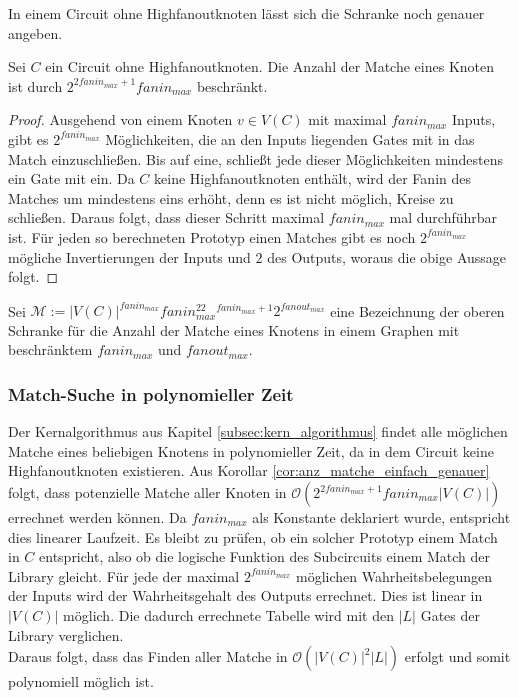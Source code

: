 \documentclass[11pt, a4paper, german]{article}
\begin{document}
In einem Circuit ohne Highfanoutknoten lässt sich die Schranke noch genauer angeben. 
\begin{cor}\label{cor:anz_matche_einfach_genauer}
Sei $C$ ein Circuit ohne Highfanoutknoten. Die Anzahl der Matche eines Knoten ist durch $2^{2fanin_{max} +1}fanin_{max}$ beschränkt.
\end{cor}
\begin{proof}
Ausgehend von einem Knoten $v \in V(C)$ mit maximal $fanin_{max}$ Inputs, gibt es  $2^{fanin_{max}}$ Möglichkeiten, die an den Inputs liegenden Gates mit in das Match einzuschließen. Bis auf eine, schließt jede dieser Möglichkeiten mindestens ein Gate mit ein. Da $C$ keine Highfanoutknoten enthält, wird der Fanin des Matches um mindestens eins erhöht, denn es ist nicht möglich, Kreise zu schließen. Daraus folgt, dass dieser Schritt maximal $fanin_{max}$ mal durchführbar ist. Für jeden so berechneten Prototyp einen Matches gibt es noch $2^{fanin_{max}}$ mögliche Invertierungen der Inputs und $2$ des Outputs, woraus die obige Aussage folgt.
\end{proof}
\begin{definition}
Sei $\mathcal{M}:= |V(C)|^{fanin_{max}} fanin_{max}^22^{fanin_{max}+1}2^{fanout_{max}}$ eine Bezeichnung der oberen Schranke für die Anzahl der Matche eines Knotens in einem Graphen mit beschränktem $fanin_{max}$ und $fanout_{max}$.
\end{definition}

\subsubsection{Match-Suche in polynomieller Zeit}
\label{subsubsec:pol_match_suche}
Der Kernalgorithmus aus Kapitel \ref{subsec:kern_algorithmus} findet alle möglichen Matche eines beliebigen Knotens in polynomieller Zeit, da in dem Circuit keine Highfanoutknoten existieren. Aus Korollar \ref{cor:anz_matche_einfach_genauer} folgt, dass potenzielle Matche aller Knoten  in $\mathcal{O}(2^{2fanin_{max} +1}fanin_{max} |V(C)|)$ errechnet werden können. Da $fanin_{max}$ als Konstante deklariert wurde, entspricht dies linearer Laufzeit. Es bleibt zu prüfen, ob  ein solcher Prototyp einem Match in $C$ entspricht, also ob die logische Funktion des Subcircuits einem Match der Library gleicht. Für jede der maximal $2^{fanin_{max}}$ möglichen Wahrheitsbelegungen der Inputs wird der Wahrheitsgehalt des Outputs errechnet. Dies ist linear in $|V(C)|$ möglich. Die dadurch errechnete Tabelle wird mit den $|L|$ Gates der Library verglichen. \\
Daraus folgt, dass das Finden aller Matche in $\mathcal{O}(|V(C)|^2|L|)$ erfolgt und somit polynomiell möglich ist.
\end{document}
